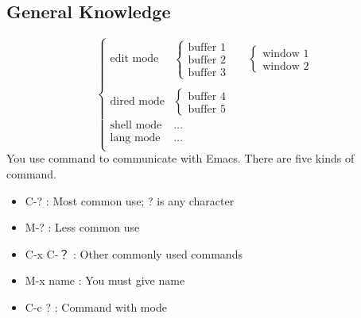 \documentclass[a4paper,12pt,twoside]{book}
\begin{document}
\begin{CJK*}{UTF8}{song}
\subsection{General Knowledge}
\[ \left\{ \begin{array}{ccc}
            \textrm{edit mode} & \left\{ \begin{array}{cc} \textrm{buffer 1} & \\ \textrm{buffer 2} & \\ \textrm{buffer 3} & \end{array} \right. & \left\{ \begin{array}{c} \textrm{window 1} \\ \textrm{window 2} \end{array} \right. \\ \\
	    \textrm{dired mode} & \left\{ \begin{array}{c} \textrm{buffer 4}\\ \textrm{buffer 5}  \end{array} \right. & \\
	    \textrm{shell mode} & \ldots & \\
	    \textrm{lang mode} & \ldots & \\
           \end{array}
    \right. \]
You use command to communicate with Emacs. There are five kinds of command.
	\begin{itemize}
	\item C-? : Most common use; ? is any character
	\item M-? : Less common use
	\item C-x C-？ : Other commonly used commands
	\item M-x name : You must give name
	\item C-c ? : Command with mode
	\end{itemize}
	

\end{CJK*}
\end{document}
